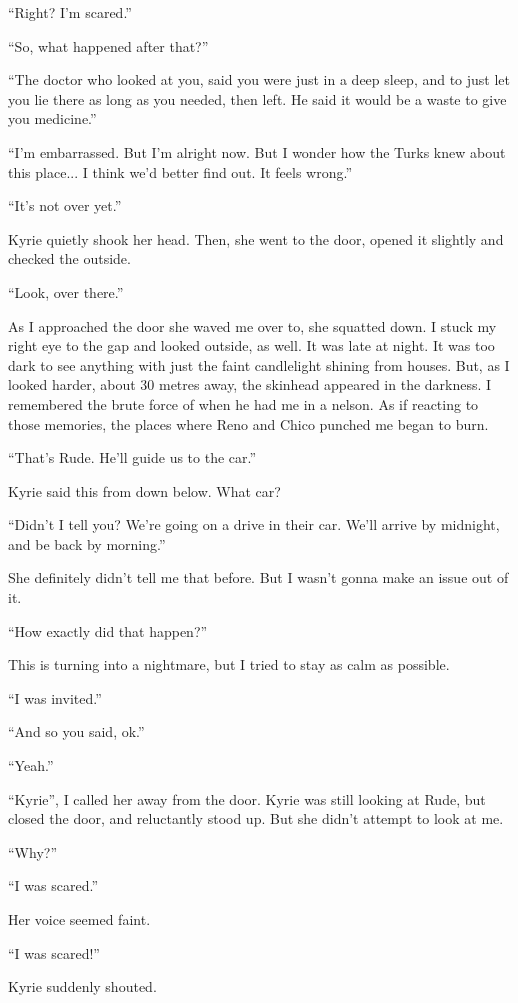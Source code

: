 \documentclass[oneside]{book}
\begin{document}
“Right? I’m scared.”

“So, what happened after that?”

“The doctor who looked at you, said you were just in a deep sleep, and to just let you lie there as long as you needed, then left. He said it would be a waste to give you medicine.”

“I’m embarrassed. But I’m alright now. But I wonder how the Turks knew about this place... I think we’d better find out. It feels wrong.”

“It’s not over yet.”

Kyrie quietly shook her head. Then, she went to the door, opened it slightly and checked the outside.

“Look, over there.”

As I approached the door she waved me over to, she squatted down. I stuck my right eye to the gap and looked outside, as well. It was late at night. It was too dark to see anything with just the faint candlelight shining from houses. But, as I looked harder, about 30 metres away, the skinhead appeared in the darkness. I remembered the brute force of when he had me in a nelson. As if reacting to those memories, the places where Reno and Chico punched me began to burn.

“That’s Rude. He’ll guide us to the car.”

Kyrie said this from down below. What car?

“Didn’t I tell you? We’re going on a drive in their car. We’ll arrive by midnight, and be back by morning.”

She definitely didn’t tell me that before. But I wasn’t gonna make an issue out of it.

“How exactly did that happen?”

This is turning into a nightmare, but I tried to stay as calm as possible.

“I was invited.”

“And so you said, ok.”

“Yeah.”

“Kyrie”, I called her away from the door. Kyrie was still looking at Rude, but closed the door, and reluctantly stood up. But she didn’t attempt to look at me.

“Why?”

“I was scared.”

Her voice seemed faint.

“I was scared!”

Kyrie suddenly shouted.
\end{document}
